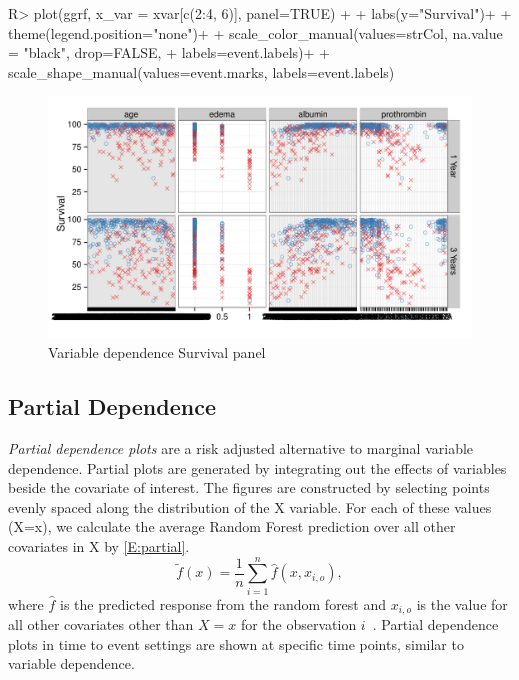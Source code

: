 \documentclass[nojss]{jss}\usepackage[]{graphicx}\usepackage[]{color}
\makeatletter
\def\maxwidth{ %
  \ifdim\Gin@nat@width>\linewidth
    \linewidth
  \else
    \Gin@nat@width
  \fi
}
\makeatother
\begin{document}
\begin{Schunk}
\begin{Sinput}
R> plot(ggrf, x_var = xvar[c(2:4, 6)], panel=TRUE) +
+   labs(y="Survival")+
+   theme(legend.position="none")+
+   scale_color_manual(values=strCol, na.value = "black", drop=FALSE,
+                      labels=event.labels)+
+   scale_shape_manual(values=event.marks, labels=event.labels)
\end{Sinput}
\begin{figure}[!htpb]

{\centering \includegraphics[width=\maxwidth]{figure/rfs-variable-plotCombines-1} 

}

\caption[Variable dependence Survival panel]{Variable dependence Survival panel\label{fig:variable-plotCombines}}
\end{figure}
\end{Schunk}

\subsection{Partial Dependence}\label{S:partialDependence}

\emph{Partial dependence plots} are a risk adjusted alternative to marginal variable dependence. Partial plots are generated by integrating out the effects of variables beside the covariate of interest. The figures are constructed by selecting points evenly spaced along the distribution of the X variable. For each of these values (X=x), we calculate the average Random Forest prediction over all other covariates in X by \eqref{E:partial}.
\begin{equation}
\tilde{f}(x) = \frac{1}{n} \sum_{i=1}^n \hat{f}(x, x_{i,o}),
\label{E:partial}
\end{equation}
where $\hat{f}$ is the predicted response from the random forest and $x_{i,o}$ is the value for all other covariates other than $X=x$ for the observation $i$~\citep{FriedmanGreedyfunction:2000}. Partial dependence plots in time to event settings are shown at specific time points, similar to variable dependence.
\end{document}

